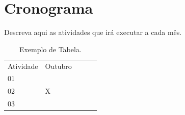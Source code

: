 \documentclass[
	article,			%
	11pt,				%
	oneside,			%
	a4paper,			%
	english,			%
	brazil,				%
	sumario=tradicional
	]{abntex2}
\begin{document}
\section{Cronograma}

Descreva aqui as atividades que irá executar a cada mês.

\begin{table}[hbt] %
	\begin{center}
		\caption{Exemplo de Tabela.} %
		\begin{tabular}{|l|l|lll}
			\cline{1-2}
			Atividade & Outubro   &  &  &  \\ \cline{1-2}\cline{1-2}
			 01 &   &  &  &  \\ \cline{1-2}
			 02  & X &  &  &  \\ \cline{1-2}
			 03    &  &  &  &  \\ \cline{1-2}
		\end{tabular}
	\end{center}
\end{table}


\end{document}
